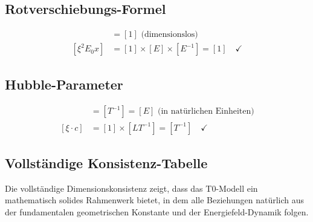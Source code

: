 	\subsection{Rotverschiebungs-Formel}
	
	\begin{align}
		[z] &= [1] \text{ (dimensionslos)} \\
		[\xi^2 E_0 x] &= [1] \times [E] \times [E^{-1}] = [1] \quad \checkmark
	\end{align}
	
	\subsection{Hubble-Parameter}
	
	\begin{align}
		[H_0] &= [T^{-1}] = [E] \text{ (in natürlichen Einheiten)} \\
		[\xi \cdot c] &= [1] \times [LT^{-1}] = [T^{-1}] \quad \checkmark
	\end{align}
	
	\subsection{Vollständige Konsistenz-Tabelle}
	
	\begin{table}[htbp]
		\centering
		\caption{Dimensionskonsistenz-Verifikation}
		\label{tab:dimensional_check}
	\end{table}
	
	Die vollständige Dimensionskonsistenz zeigt, dass das T0-Modell ein mathematisch solides Rahmenwerk bietet, in dem alle Beziehungen natürlich aus der fundamentalen geometrischen Konstante und der Energiefeld-Dynamik folgen.
	
